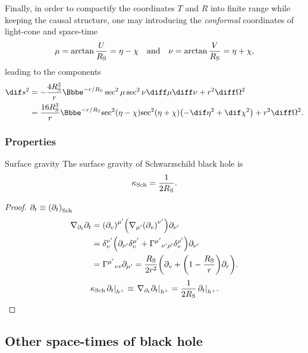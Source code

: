 Finally, in order to compactify the coordinates $T$ and $R$ into finite range
while keeping the causal structure, one may introducing the \emph{conformal}
coordinates of light-cone and space-time
\begin{equation}
\mu = \arctan\frac{U}{R_\text{S}} = \eta - \chi \quad\text{and}\quad
\nu = \arctan\frac{V}{R_\text{S}} = \eta + \chi,
\end{equation}
leading to the components
\begin{align}
\dif s^2
&= -\frac{4\rSch^3}{r}\ee^{-r/\rSch}\sec^2\mu\sec^2\nu \diff\mu\diff\nu
+ r^2\diff\Omega^2 \\
&= \frac{16\rSch^3}{r}\ee^{-r/\rSch}
\rfun{\sec^2}{\eta-\chi}\rfun{\sec^2}{\eta+\chi}
\rbr{-\dif\eta^2+\dif\chi^2}
+ r^2\diff\Omega^2.
\end{align}

\subsubsection{Properties}

\begin{namedthm}{Surface gravity}
The surface gravity of Schwarzschild black hole is
\begin{equation}
\kappa_\text{Sch} = \frac{1}{2R_\text{S}}.
\label{eq:sur-gra-sch}
\end{equation}
\end{namedthm}
\begin{proof}
$\partial_t \equiv {\left(\partial_t\right)}_\text{Sch}$
\begin{align*}
\nabla_{\partial_t}\partial_t &= {\left(\partial_v\right)}^{\mu'}
{\left(\nabla_{\mu'}{\left(\partial_v\right)}^{\nu'}\right)}\partial_{\nu'} \\
&= \delta^{\nu'}_{v} {\left(\partial_{\nu'} \delta^{\mu'}_{v}
+\Gamma^{\mu'}{}_{\nu'\rho'}\delta^{\rho'}_{v}\right)}\partial_{\nu'} \\
&= \Gamma^{\mu'}{}_{vv}\partial_{\mu'}
= \frac{R_\text{S}}{2r^2}{\left(\partial_v + {\left(1-\frac{R_\text{S}}{r}\right)}\partial_r\right)}.
\end{align*}
\begin{equation}
\kappa_\text{Sch} {\left.\partial_t\right|_{{h^+}}} \equiv
{\left.\nabla_{\partial_t}\partial_t\right|_{{h^+}}} = \frac{1}{2R_\text{S}} {\left.\partial_t\right|_{{h^+}}}.
\end{equation}
\end{proof}

\subsection{Other space-times of black hole}

